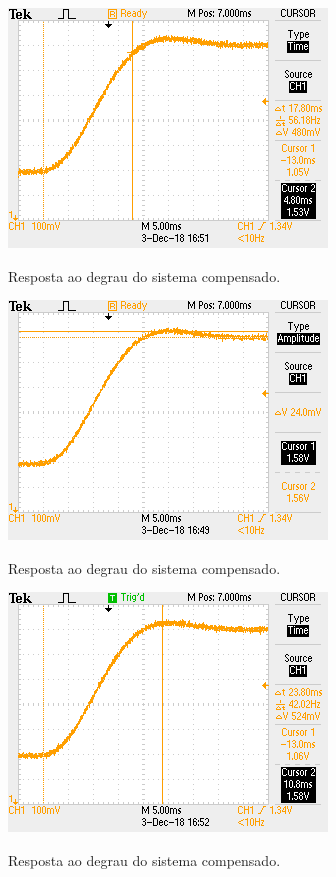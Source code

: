 \documentclass[
	article,			%
	11pt,				%
	oneside,			%
	a4paper,			%
	english,			%
	brazil,				%
	sumario=tradicional
	]{abntex2}
\begin{document}
\begin{figure}[htb!]
	\centering
	\caption{Resposta ao degrau do sistema compensado.}
	\includegraphics[scale=1.2]{./img/ts5_before.png}
	\label{fig:ts5_before}
\end{figure}

\pagebreak

\begin{figure}[htb!]
	\centering
	\caption{Resposta ao degrau do sistema compensado.}
	\includegraphics[scale=1.2]{./img/ts5Ampli_after.png}
	\label{fig:ts5Ampli_after}
\end{figure}

\begin{figure}[htb!]
	\centering
	\caption{Resposta ao degrau do sistema compensado.}
	\includegraphics[scale=1.2]{./img/ts5_after.png}
	\label{fig:ts5_after}
\end{figure}
\end{document}
